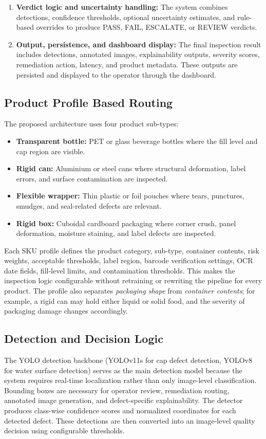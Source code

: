 \documentclass{ieeeaccess}
\begin{document}
\begin{enumerate}
    \item \textbf{Verdict logic and uncertainty handling:} The system combines detections, confidence thresholds, optional uncertainty estimates, and rule-based overrides to produce PASS, FAIL, ESCALATE, or REVIEW verdicts.
    \item \textbf{Output, persistence, and dashboard display:} The final inspection result includes detections, annotated images, explainability outputs, severity scores, remediation action, latency, and product metadata. These outputs are persisted and displayed to the operator through the dashboard.
\end{enumerate}

\subsection{Product Profile Based Routing}
The proposed architecture uses four product sub-types:

\begin{itemize}
    \item \textbf{Transparent bottle:} PET or glass beverage bottles where the fill level and cap region are visible.
    \item \textbf{Rigid can:} Aluminium or steel cans where structural deformation, label errors, and surface contamination are inspected.
    \item \textbf{Flexible wrapper:} Thin plastic or foil pouches where tears, punctures, smudges, and seal-related defects are relevant.
    \item \textbf{Rigid box:} Cuboidal cardboard packaging where corner crush, panel deformation, moisture staining, and label defects are inspected.
\end{itemize}

Each SKU profile defines the product category, sub-type, container contents, risk weights, acceptable thresholds, label region, barcode verification settings, OCR date fields, fill-level limits, and contamination thresholds. This makes the inspection logic configurable without retraining or rewriting the pipeline for every product. The profile also separates \textit{packaging shape} from \textit{container contents}; for example, a rigid can may hold either liquid or solid food, and the severity of packaging damage changes accordingly.

\subsection{Detection and Decision Logic}
The YOLO detection backbone (YOLOv11s for cap defect detection, YOLOv8 for water surface detection) serves as the main detection model because the system requires real-time localization rather than only image-level classification. Bounding boxes are necessary for operator review, remediation routing, annotated image generation, and defect-specific explainability. The detector produces class-wise confidence scores and normalized coordinates for each detected defect. These detections are then converted into an image-level quality decision using configurable thresholds.
\end{document}

